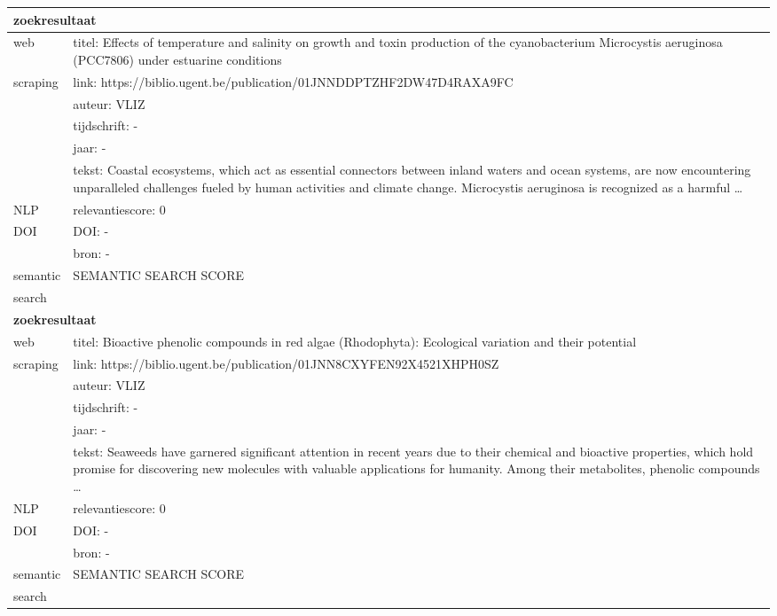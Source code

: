 \begin{table}[h!]
\begin{tabularx}{\textwidth}{|p{4cm}|X|}
        \hline
        \multicolumn{2}{|X|}{\textbf{zoekresultaat}} \\
        \hline
        web &titel: Effects of temperature and salinity on growth and toxin production of the cyanobacterium Microcystis aeruginosa (PCC7806) under estuarine conditions\\
        scraping&link: https://biblio.ugent.be/publication/01JNNDDPTZHF2DW47D4RAXA9FC\\
        &auteur: VLIZ\\
        &tijdschrift: -\\
        &jaar: -\\
        &tekst: Coastal ecosystems, which act as essential connectors between inland waters and ocean systems, are now encountering unparalleled challenges fueled by human activities and climate change. Microcystis aeruginosa is recognized as a harmful …\\
        \hline
        NLP&relevantiescore: 0\\
        \hline
        DOI&DOI: -\\
        &bron: -\\
        \hline
        semantic&SEMANTIC SEARCH SCORE\\
        search&\\
        \hline
        \multicolumn{2}{|X|}{\textbf{zoekresultaat}} \\
        \hline
        web &titel: Bioactive phenolic compounds in red algae (Rhodophyta): Ecological variation and their potential\\
        scraping&link: https://biblio.ugent.be/publication/01JNN8CXYFEN92X4521XHPH0SZ\\
        &auteur: VLIZ\\
        &tijdschrift: -\\
        &jaar: -\\
        &tekst: Seaweeds have garnered significant attention in recent years due to their chemical and bioactive properties, which hold promise for discovering new molecules with valuable applications for humanity. Among their metabolites, phenolic compounds …\\
        \hline
        NLP&relevantiescore: 0\\
        \hline
        DOI&DOI: -\\
        &bron: -\\
        \hline
        semantic&SEMANTIC SEARCH SCORE\\
        search&\\
        \hline
    \end{tabularx}
    \label{table:email20250308}
\end{table}
